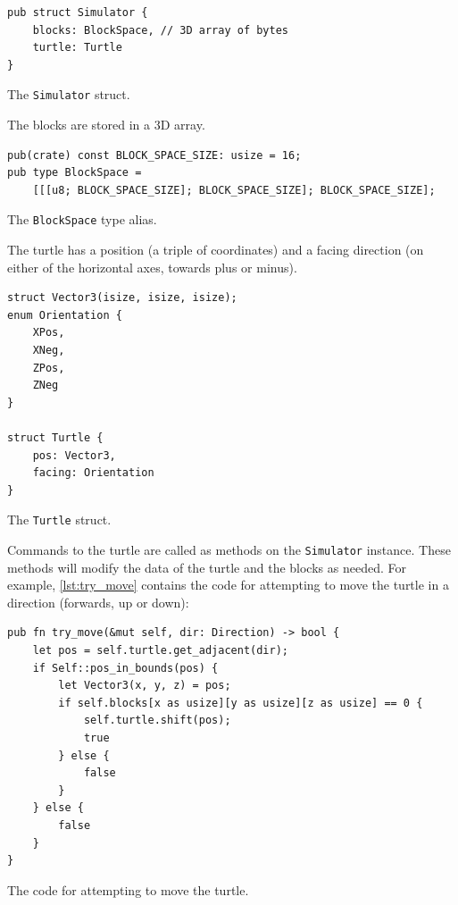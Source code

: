 \documentclass{report}
\newenvironment{code}{\captionsetup{type=listing}}{}
\begin{document}
\begin{code}
    \begin{verbatim}
pub struct Simulator {
    blocks: BlockSpace, // 3D array of bytes
    turtle: Turtle
}
    \end{verbatim}
    \caption{The \texttt{Simulator} struct.}
    \label{lst:simulator_struct}
\end{code}

The blocks are stored in a 3D array.

\begin{code}
    \begin{verbatim}
pub(crate) const BLOCK_SPACE_SIZE: usize = 16;
pub type BlockSpace = 
    [[[u8; BLOCK_SPACE_SIZE]; BLOCK_SPACE_SIZE]; BLOCK_SPACE_SIZE];
    \end{verbatim}
    \caption{The \texttt{BlockSpace} type alias.}
    \label{lst:blockspace_type}
\end{code}

The turtle has a position (a triple of coordinates) and a facing direction (on either of the horizontal axes, towards plus or minus).

\begin{code}
    \begin{verbatim}
struct Vector3(isize, isize, isize);
enum Orientation {
    XPos,
    XNeg,
    ZPos,
    ZNeg
}

struct Turtle {
    pos: Vector3,
    facing: Orientation
}
    \end{verbatim}
    \caption{The \texttt{Turtle} struct.}
    \label{lst:turtle_struct}
\end{code}

Commands to the turtle are called as methods on the \verb|Simulator| instance. These methods will modify the data of the turtle and the blocks as needed. For example, \autoref{lst:try_move} contains the code for attempting to move the turtle in a direction (forwards, up or down):

\begin{code}
    \begin{verbatim}
pub fn try_move(&mut self, dir: Direction) -> bool {
    let pos = self.turtle.get_adjacent(dir);
    if Self::pos_in_bounds(pos) {
        let Vector3(x, y, z) = pos;
        if self.blocks[x as usize][y as usize][z as usize] == 0 {
            self.turtle.shift(pos);
            true
        } else {
            false
        }
    } else {
        false
    }
}
    \end{verbatim}
    \caption{The code for attempting to move the turtle.}        
    \label{lst:try_move}
\end{code}
\end{document}
